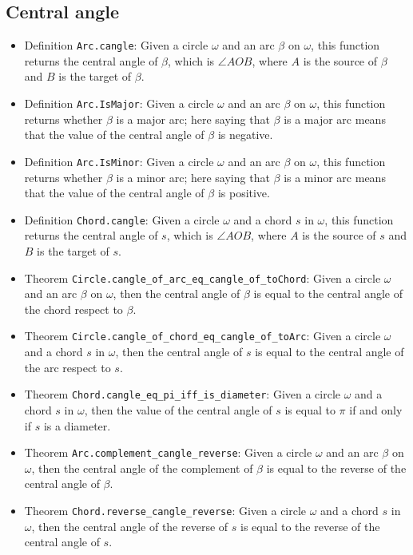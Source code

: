 \documentclass[12pt]{amsart}
\begin{document}
\subsection{Central angle}
\begin{itemize}
    \item Definition \verb|Arc.cangle|: Given a circle $\omega$ and an arc $\beta$ on $\omega$, this function returns the central angle of $\beta$, which is $\angle A O B$, where $A$ is the source of $\beta$ and $B$ is the target of $\beta$.
    \item Definition \verb|Arc.IsMajor|: Given a circle $\omega$ and an arc $\beta$ on $\omega$, this function returns whether $\beta$ is a major arc; here saying that $\beta$ is a major arc means that the value of the central angle of $\beta$ is negative.
    \item Definition \verb|Arc.IsMinor|: Given a circle $\omega$ and an arc $\beta$ on $\omega$, this function returns whether $\beta$ is a minor arc; here saying that $\beta$ is a minor arc means that the value of the central angle of $\beta$ is positive.
    \item Definition \verb|Chord.cangle|: Given a circle $\omega$ and a chord $s$ in $\omega$, this function returns the central angle of $s$, which is $\angle A O B$, where $A$ is the source of $s$ and $B$ is the target of $s$.
    \item Theorem \verb|Circle.cangle_of_arc_eq_cangle_of_toChord|: Given a circle $\omega$ and an arc $\beta$ on $\omega$, then the central angle of $\beta$ is equal to the central angle of the chord respect to $\beta$.
    \item Theorem \verb|Circle.cangle_of_chord_eq_cangle_of_toArc|: Given a circle $\omega$ and a chord $s$ in $\omega$, then the central angle of $s$ is equal to the central angle of the arc respect to $s$.
    \item Theorem \verb|Chord.cangle_eq_pi_iff_is_diameter|: Given a circle $\omega$ and a chord $s$ in $\omega$, then the value of the central angle of $s$ is equal to $\pi$ if and only if $s$ is a diameter.
    \item Theorem \verb|Arc.complement_cangle_reverse|: Given a circle $\omega$ and an arc $\beta$ on $\omega$, then the central angle of the complement of $\beta$ is equal to the reverse of the central angle of $\beta$.
    \item Theorem \verb|Chord.reverse_cangle_reverse|: Given a circle $\omega$ and a chord $s$ in $\omega$, then the central angle of the reverse of $s$ is equal to the reverse of the central angle of $s$.

\end{itemize}
\end{document}
